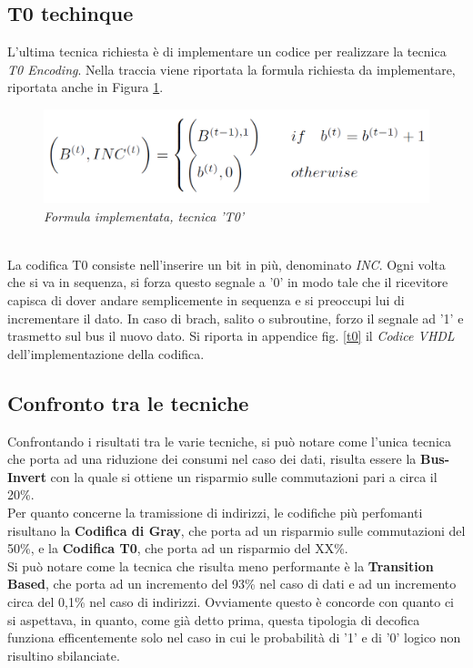 \subsection{T0 techinque}
L'ultima tecnica richiesta è di implementare un codice per realizzare la tecnica \textit{T0 Encoding}. Nella traccia viene riportata la formula richiesta da implementare, riportata anche in Figura \ref{formula_t0}.\\
\begin{figure}[!htb]
	\centering
	\includegraphics[scale=0.8]{immagini/formula_t0}
	\caption{\textit{Formula implementata, tecnica 'T0'}}
	\label{formula_t0}
\end{figure}
\\
\noindent La codifica T0 consiste nell'inserire un bit in più, denominato \textit{INC}. Ogni volta che si va in sequenza, si forza questo segnale a '0' in modo tale che il ricevitore capisca di dover andare semplicemente in sequenza e si preoccupi lui di incrementare il dato. In caso di brach, salito o subroutine, forzo il segnale ad '1' e trasmetto sul bus il nuovo dato. Si riporta in appendice fig. \ref{t0} il \textit{Codice VHDL} dell'implementazione della codifica.


\subsection{Confronto tra le tecniche}
Confrontando i risultati tra le varie tecniche, si può notare come l'unica tecnica che porta ad una riduzione dei consumi nel caso dei dati, risulta essere la \textbf{Bus-Invert} con la quale si ottiene un risparmio sulle commutazioni pari a circa il 20\%. \\ %
Per quanto concerne la tramissione di indirizzi, le codifiche più perfomanti risultano la \textbf{Codifica di Gray}, che porta ad un risparmio sulle commutazioni del 50\%, e la \textbf{Codifica T0}, che porta ad un risparmio del XX\%.\\
Si può notare come la tecnica che risulta meno performante è la \textbf{Transition Based}, che porta ad un incremento del 93\% nel caso di dati e ad un incremento circa del 0,1\% nel caso di indirizzi. Ovviamente questo è concorde con quanto ci si aspettava, in quanto, come già detto prima, questa tipologia di decofica funziona efficentemente solo nel caso in cui le probabilità di '1' e di '0' logico non risultino sbilanciate.

